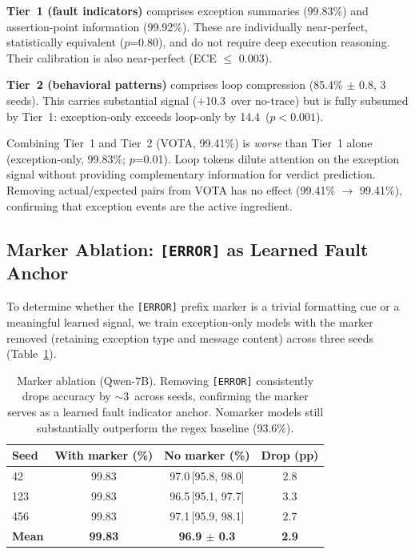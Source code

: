 \documentclass[11pt]{article}
\newcommand{\pp}{\,\text{pp}}
\begin{document}
\textbf{Tier~1 (fault indicators)} comprises exception summaries (99.83\%) and assertion-point information (99.92\%).
These are individually near-perfect, statistically equivalent ($p$=0.80), and do not require deep execution reasoning.
Their calibration is also near-perfect (ECE $\leq$ 0.003).

\textbf{Tier~2 (behavioral patterns)} comprises loop compression (85.4\% $\pm$ 0.8, 3 seeds).
This carries substantial signal ($+$10.3\pp{} over no-trace) but is fully subsumed by Tier~1: exception-only exceeds loop-only by 14.4\pp{} ($p < 0.001$).

Combining Tier~1 and Tier~2 (VOTA, 99.41\%) is \emph{worse} than Tier~1 alone (exception-only, 99.83\%; $p$=0.01).
Loop tokens dilute attention on the exception signal without providing complementary information for verdict prediction.
Removing actual/expected pairs from VOTA has no effect (99.41\% $\rightarrow$ 99.41\%), confirming that exception events are the active ingredient.

\subsection{Marker Ablation: \texttt{[ERROR]} as Learned Fault Anchor}
\label{sec:marker}

To determine whether the \texttt{[ERROR]} prefix marker is a trivial formatting cue or a meaningful learned signal, we train exception-only models with the marker removed (retaining exception type and message content) across three seeds (Table~\ref{tab:marker}).

\begin{table}[t]
\centering
\small
\caption{Marker ablation (Qwen-7B). Removing \texttt{[ERROR]} consistently drops accuracy by ${\sim}$3\pp{} across seeds, confirming the marker serves as a learned fault indicator anchor. Nomarker models still substantially outperform the regex baseline (93.6\%).}
\label{tab:marker}
\begin{tabular}{@{}lccc@{}}
\toprule
\textbf{Seed} & \textbf{With marker (\%)} & \textbf{No marker (\%)} & \textbf{Drop (pp)} \\
\midrule
42  & 99.83 & 97.0\,[95.8, 98.0] & 2.8 \\
123 & 99.83 & 96.5\,[95.1, 97.7] & 3.3 \\
456 & 99.83 & 97.1\,[95.9, 98.1] & 2.7 \\
\midrule
\textbf{Mean} & \textbf{99.83} & \textbf{96.9 $\pm$ 0.3} & \textbf{2.9} \\
\bottomrule
\end{tabular}
\end{table}
\end{document}
